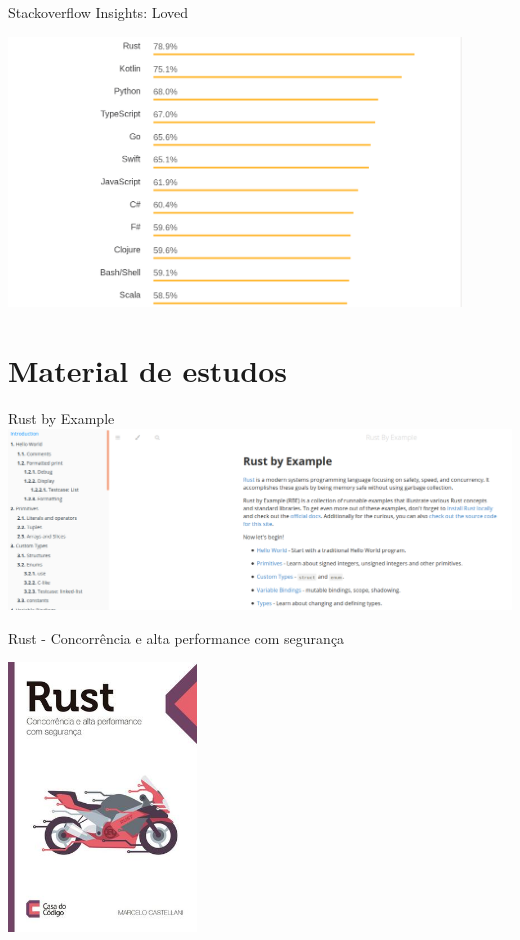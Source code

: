 \documentclass[aspectratio=169]{beamer}
\begin{document}
\begin{frame}{Stackoverflow Insights: Loved}
	\begin{center}
		\includegraphics[width=12.0cm]{imgs/stackoverflow-loved.png}	
	\end{center}
\end{frame}

\section{Material de estudos}

\begin{frame}{Rust by Example}
	\includegraphics[width=15.0cm]{imgs/rust-by-example.png}	
\end{frame}

\begin{frame}{Rust - Concorrência e alta performance com segurança}
	\begin{center}
		\includegraphics[width=5.0cm]{imgs/casa-do-codigo-rust.jpg}	
	\end{center}
\end{frame}
\end{document}
